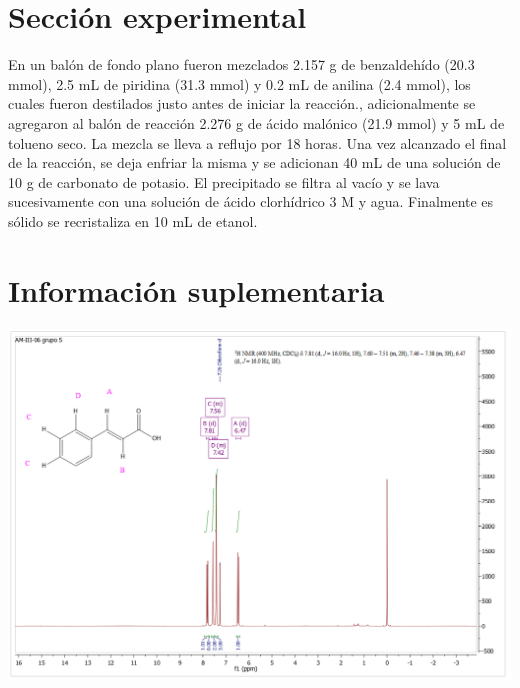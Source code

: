 \documentclass[fleqn,11pt]{SelfArx}
\begin{document}
\section{Secci\'on experimental}
En un balón de fondo plano fueron mezclados 2.157 g de benzaldehído (20.3 mmol), 2.5 mL de piridina (31.3 mmol) y 0.2 mL de anilina (2.4 mmol), los cuales fueron destilados justo antes de iniciar la reacción., adicionalmente se agregaron al balón de reacción 2.276 g de ácido malónico (21.9 mmol) y 5 mL de tolueno seco. La mezcla se lleva a reflujo por 18 horas. Una vez alcanzado el final de la reacción, se deja enfriar la misma y se adicionan 40 mL de una solución de 10 g de carbonato de potasio. El precipitado se filtra al vacío y se lava sucesivamente con una solución de ácido clorhídrico 3 M y agua. Finalmente es sólido se recristaliza en 10 mL de etanol. 

{}



\onecolumn
\section{Informaci\'on suplementaria}\label{sec: complementaria}

{
	\begin{minipage}{0.9\textheight}
		\centering
		\includegraphics[height=0.65\textheight]{RMN/H.png}
		\label{HRMN}
	\end{minipage}
}
\end{document}
